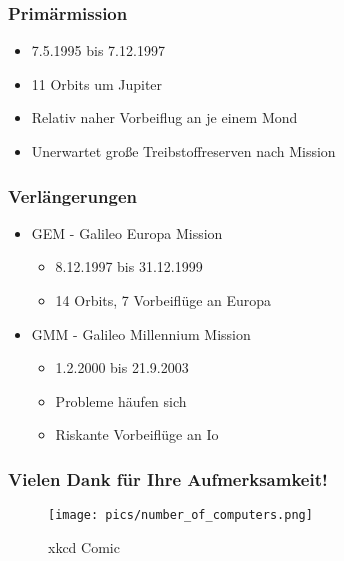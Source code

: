 \begin{frame}
\frametitle{Prim\"armission}
	\begin{itemize}
		\item 7.5.1995 bis 7.12.1997
		\item 11 Orbits um Jupiter
		\item Relativ naher Vorbeiflug an je einem Mond
		\item Unerwartet große Treibstoffreserven nach Mission
	\end{itemize}
\end{frame}

\begin{frame}
	\frametitle{Verl\"angerungen}
	\begin{itemize}
		\item GEM - Galileo Europa Mission
		\begin{itemize}
			\item 8.12.1997 bis 31.12.1999
			\item 14 Orbits, 7 Vorbeifl\"uge an Europa
		\end{itemize}
		\item GMM - Galileo Millennium Mission
		\begin{itemize}
			\item 1.2.2000 bis 21.9.2003
			\item Probleme h\"aufen sich
			\item Riskante Vorbeifl\"uge an Io
		\end{itemize}
	\end{itemize}
\end{frame}

\begin{frame}
	\frametitle{Vielen Dank f\"ur Ihre Aufmerksamkeit!}
	\begin{figure}
		\centering
		\texttt{[image: pics/number\_of\_computers.png]}
		\caption{xkcd Comic\cite{xkcd}}
		\label{NUMBER_OF_COMPUTERS}
	\end{figure}
\end{frame}
